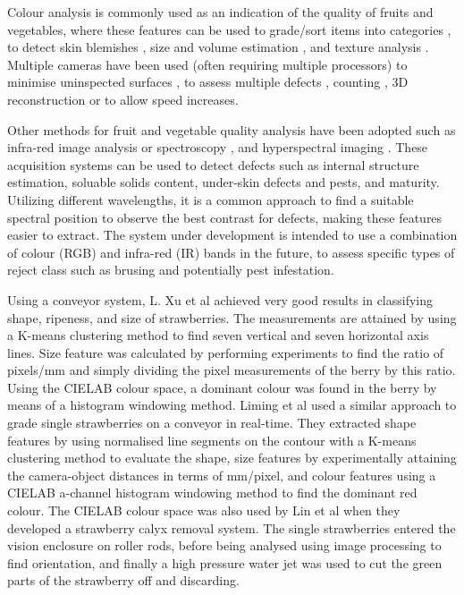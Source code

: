 \documentclass[fleqn,twoside,12pt]{report}
\begin{document}
Colour analysis is commonly used as an indication of the quality of fruits and vegetables, where these features can be used to grade/sort items into categories \cite{jun, elmasry3}, to detect skin blemishes \cite{blasco3, leemans}, size and volume estimation \cite{bundit, elmasry3}, and texture analysis \cite{jun, rakun}. Multiple cameras have been used (often requiring multiple processors) to minimise uninspected surfaces \cite{zouxiao, qingzhong}, to assess multiple defects \cite{blasco4}, counting \cite{song}, 3D reconstruction \cite{panitnat} or to allow speed increases\cite{reece}.   

Other methods for fruit and vegetable quality analysis have been adopted such as infra-red image analysis or spectroscopy \cite{guthrie, bureau, yande}, and hyperspectral imaging \cite{renfu} \cite{jianwei, mendoza, rajkumar}. These acquisition systems can be used to detect defects such as internal structure estimation, soluable solids content, under-skin defects and pests, and maturity. Utilizing different wavelengths, it is a common approach to find a suitable spectral position to observe the best contrast for defects, making these features easier to extract\cite{ariana, piotr}. The system under development is intended to use a combination of colour (RGB) and infra-red (IR) bands in the future, to assess specific types of reject class such as brusing and potentially pest infestation. 

Using a conveyor system, L. Xu et al \cite{xu} achieved very good results in classifying shape, ripeness, and size of strawberries. The measurements are attained by using a K-means clustering method to find seven vertical and seven horizontal axis lines. Size feature was calculated by performing experiments to find the ratio of pixels/mm and simply dividing the pixel measurements of the berry by this ratio. Using the CIELAB colour space, a dominant colour was found in the berry by means of a histogram windowing method. Liming et al \cite{liming} used a similar approach to grade single strawberries on a conveyor in real-time. They extracted shape features by using normalised line segments on the contour with a K-means clustering method to evaluate the shape, size features by experimentally attaining the camera-object distances in terms of mm/pixel, and colour features using a CIELAB a-channel histogram windowing method to find the dominant red colour. The CIELAB colour space was also used by Lin et al \cite{lin} when they developed a strawberry calyx removal system. The single strawberries entered the vision enclosure on roller rods, before being analysed using image processing to find orientation, and finally a high pressure water jet was used to cut the green parts of the strawberry off and discarding.
\end{document}
